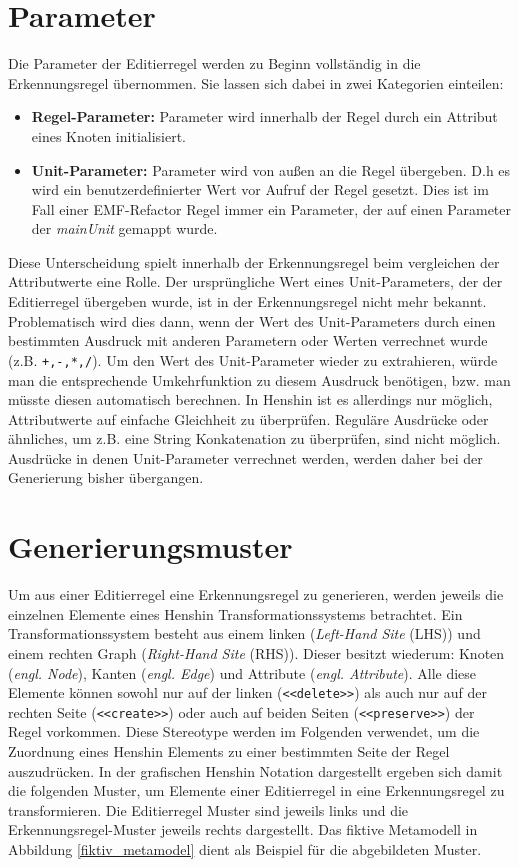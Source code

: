 \section{Parameter}
\label{parameter}

Die Parameter der Editierregel werden zu Beginn vollständig in die Erkennungsregel übernommen. Sie
lassen sich dabei in zwei Kategorien einteilen:

\begin{itemize}
  \item \textbf{Regel-Parameter:} Parameter wird innerhalb der Regel durch ein Attribut eines Knoten
  initialisiert.
  \item \textbf{Unit-Parameter:} Parameter wird von außen an die Regel übergeben. D.h es wird ein
  benutzerdefinierter Wert vor Aufruf der Regel gesetzt. Dies ist im Fall einer EMF-Refactor
  Regel immer ein Parameter, der auf einen Parameter der  \textit{mainUnit} gemappt wurde.
\end{itemize}
Diese Unterscheidung spielt innerhalb der Erkennungsregel beim vergleichen der Attributwerte eine
Rolle. Der ursprüngliche Wert eines Unit-Parameters, der der Editierregel übergeben wurde, ist in
der Erkennungsregel nicht mehr bekannt. Problematisch wird dies dann, wenn der Wert des Unit-Parameters
durch einen bestimmten Ausdruck mit anderen Parametern oder Werten verrechnet wurde (z.B.
\texttt{+,-,*,/}). Um den Wert des Unit-Parameter wieder zu extrahieren, würde man die entsprechende
Umkehrfunktion zu diesem Ausdruck benötigen, bzw. man müsste diesen automatisch berechnen. In
Henshin ist es allerdings nur möglich, Attributwerte auf einfache Gleichheit zu überprüfen. Reguläre
Ausdrücke oder ähnliches, um z.B. eine String Konkatenation zu überprüfen, sind nicht möglich.
Ausdrücke in denen Unit-Parameter verrechnet werden, werden daher bei der Generierung bisher
übergangen.

\section{Generierungsmuster}
\label{patterns}

Um aus einer Editierregel eine Erkennungsregel zu generieren, werden jeweils die einzelnen Elemente
eines Henshin Transformationssystems betrachtet. Ein Transformationssystem besteht aus einem linken
(\textit{Left-Hand Site} (LHS)) und einem rechten Graph (\textit{Right-Hand Site} (RHS)). Dieser
besitzt wiederum: Knoten (\textit{engl. Node}), Kanten (\textit{engl. Edge}) und Attribute
(\textit{engl. Attribute}). Alle diese Elemente können sowohl nur auf der linken
(\texttt{<<delete>>}) als auch nur auf der rechten Seite (\texttt{<<create>>}) oder auch auf beiden
Seiten (\texttt{<<preserve>>})  der Regel vorkommen. Diese Stereotype werden im Folgenden verwendet,
um die Zuordnung eines Henshin Elements zu einer bestimmten Seite der Regel auszudrücken. In der
grafischen Henshin Notation dargestellt ergeben sich damit die folgenden Muster, um Elemente einer
Editierregel in eine Erkennungsregel zu transformieren. Die Editierregel Muster sind jeweils links
und die Erkennungsregel-Muster jeweils rechts dargestellt. Das fiktive Metamodell in Abbildung
\ref{fiktiv_metamodel} dient als Beispiel für die abgebildeten Muster.

